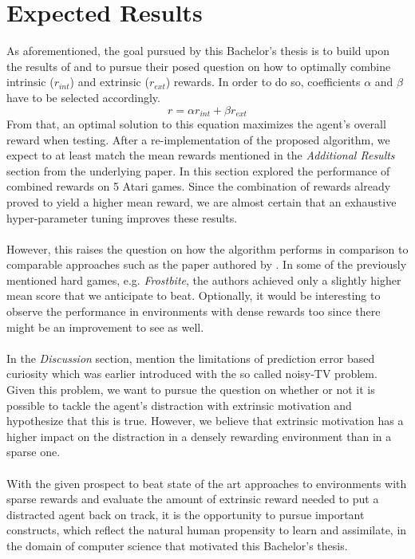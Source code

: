 \documentclass[draft,final]{vutinfth} %
\begin{document}
    \section{Expected Results}
    As aforementioned, the goal pursued by this Bachelor's thesis is to build upon the results of \cite{burda_large-scale_2018} and to pursue their posed question on how to optimally combine intrinsic ($r_{int}$) and extrinsic ($r_{ext}$) rewards.
    In order to do so, coefficients $\alpha$ and $\beta$ have to be selected accordingly.
    $$r=\alpha r_{int} + \beta r_{ext}$$
    From that, an optimal solution to this equation maximizes the agent's overall reward when testing.
    After a re-implementation of the proposed algorithm, we expect to at least match the mean rewards mentioned in the \textit{Additional Results} section from the underlying paper.
    In this section \cite{burda_large-scale_2018} explored the performance of combined rewards on 5 Atari games.
    Since the combination of rewards already proved to yield a higher mean reward, we are almost certain that an exhaustive hyper-parameter tuning improves these results.
    \\\\
    However, this raises the question on how the algorithm performs in comparison to comparable approaches such as the paper authored by \cite{kim_emi_2019}.
    In some of the previously mentioned hard games, e.g. \textit{Frostbite}, the authors achieved only a slightly higher mean score that we anticipate to beat.
    Optionally, it would be interesting to observe the performance in environments with dense rewards too since there might be an improvement to see as well.
    \\\\
    In the \textit{Discussion} section, \cite{burda_large-scale_2018} mention the limitations of prediction error based curiosity which was earlier introduced with the so called noisy-TV problem.
    Given this problem, we want to pursue the question on whether or not it is possible to tackle the agent's distraction with extrinsic motivation and hypothesize that this is true.
    However, we believe that extrinsic motivation has a higher impact on the distraction in a densely rewarding environment than in a sparse one.
    \\\\
    With the given prospect to beat state of the art approaches to environments with sparse rewards and evaluate the amount of extrinsic reward needed to put a distracted agent back on track, it is the opportunity to pursue important constructs, which reflect the natural human propensity to learn and assimilate, in the domain of computer science that motivated this Bachelor's thesis.
\end{document}
